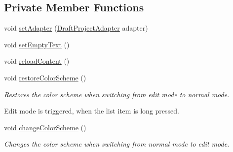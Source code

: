 \subsection*{Private Member Functions}
\begin{DoxyCompactItemize}
\item 
void \hyperlink{classorg_1_1buildmlearn_1_1toolkit_1_1fragment_1_1DraftsFragment_a33d7ec27a26bc84724a5db3dc0566bc7}{set\+Adapter} (\hyperlink{classorg_1_1buildmlearn_1_1toolkit_1_1adapter_1_1DraftProjectAdapter}{Draft\+Project\+Adapter} adapter)
\item 
void \hyperlink{classorg_1_1buildmlearn_1_1toolkit_1_1fragment_1_1DraftsFragment_ac5ece2674f93f931bc57d70848a98180}{set\+Empty\+Text} ()
\item 
void \hyperlink{classorg_1_1buildmlearn_1_1toolkit_1_1fragment_1_1DraftsFragment_a646b5e20a95f8f6ef9f58b7ea3f45a9f}{reload\+Content} ()
\item 
void \hyperlink{classorg_1_1buildmlearn_1_1toolkit_1_1fragment_1_1DraftsFragment_abef1bb8aa53038a5cd639e61c68feefa}{restore\+Color\+Scheme} ()
\begin{DoxyCompactList}\small\item\em Restores the color scheme when switching from edit mode to normal mode. 

Edit mode is triggered, when the list item is long pressed. \end{DoxyCompactList}\item 
void \hyperlink{classorg_1_1buildmlearn_1_1toolkit_1_1fragment_1_1DraftsFragment_a817ce3ea608863258adf9549d7fb4a1e}{change\+Color\+Scheme} ()
\begin{DoxyCompactList}\small\item\em Changes the color scheme when switching from normal mode to edit mode. 


\end{DoxyCompactList}
\end{DoxyCompactItemize}
